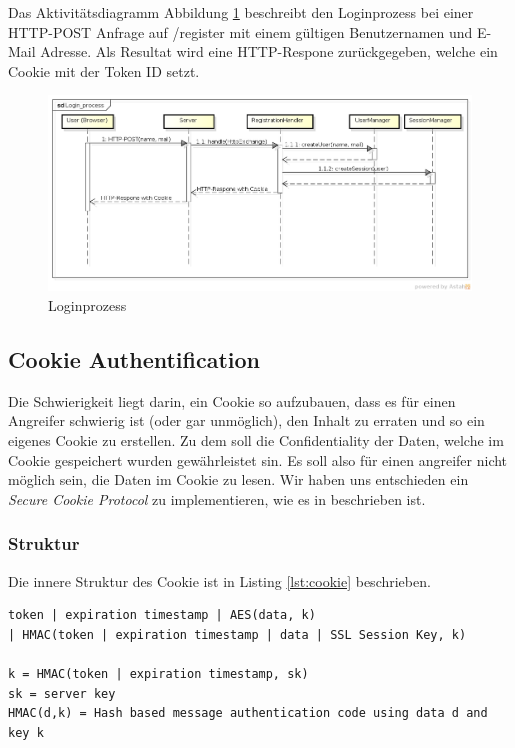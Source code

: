 Das Aktivitätsdiagramm Abbildung \ref{fig:process} beschreibt den Loginprozess bei einer HTTP-POST Anfrage auf /register mit einem gültigen Benutzernamen und E-Mail Adresse.
Als Resultat wird eine HTTP-Respone zurückgegeben, welche ein Cookie mit der Token ID setzt.

\begin{figure}[H]
	\begin{center}
		\includegraphics[width=1.0\textwidth]{./content/Login_process.png}
	\end{center}
	\caption{Loginprozess}
	\label{fig:process}
\end{figure}

\subsection{Cookie Authentification}

Die Schwierigkeit liegt darin, ein Cookie so aufzubauen, dass es für einen Angreifer schwierig ist (oder gar unmöglich), den Inhalt zu
erraten und so ein eigenes Cookie zu erstellen. Zu dem soll die Confidentiality der Daten, welche im Cookie gespeichert wurden
gewährleistet sin. Es soll also für einen angreifer nicht möglich sein, die Daten im Cookie zu lesen. Wir haben uns entschieden
ein \textit{Secure Cookie Protocol} zu implementieren, wie es in \cite{securecookie} beschrieben ist.

\subsubsection{Struktur}

Die innere Struktur des Cookie ist in Listing \ref{lst:cookie} beschrieben.

\begin{lstlisting}[caption=Innere Struktur des Cookie,label={lst:cookie}]
token | expiration timestamp | AES(data, k) 
| HMAC(token | expiration timestamp | data | SSL Session Key, k)

k = HMAC(token | expiration timestamp, sk)
sk = server key
HMAC(d,k) = Hash based message authentication code using data d and key k
\end{lstlisting}

